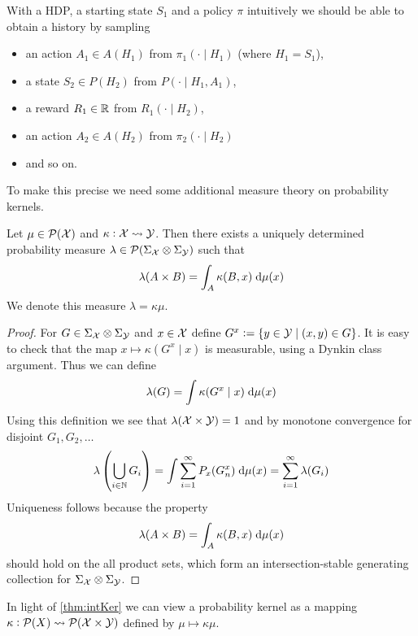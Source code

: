 With a HDP, a starting state $S_1$ and a policy $\pi$ intuitively we
should be able to obtain a history by sampling
\begin{itemize}
  \item an action $A_1 \in A(H_1)$ from $\pi_1(\cdot \mid H_1)$
    (where $H_1 = S_1$),
  \item a state $S_2 \in P(H_2)$ from $P(\cdot \mid H_1, A_1)$,
  \item a reward $R_1 \in \mathbb{R}$ from  $R_1(\cdot \mid H_2)$,
  \item an action $A_2 \in A(H_2)$ from $\pi_2(\cdot \mid H_2)$
  \item and so on.
\end{itemize}

To make this precise we need some additional measure theory on
probability kernels.

\begin{thm}
  Let $\mu \in \mathcal{P}(\mathcal{X})$ and $\kappa : \mathcal{X} \leadsto \mathcal{Y}$.
  Then there exists a uniquely determined probability measure
  $\lambda \in \mathcal{P}(\Sigma_\mathcal{X} \otimes \Sigma_\mathcal{Y})$
  such that
  \[ \lambda(A \times B) = \int_A \kappa(B, x) \; \mathrm{d} \mu(x) \]
  \label{thm:intKer}
  We denote this measure $\lambda = \kappa \mu$.
\end{thm}
\begin{proof}
  For $G \in \Sigma_\mathcal{X} \otimes \Sigma_\mathcal{Y}$ and $x \in \mathcal{X}$ define
  $G^x \vcentcolon= \{ y \in \mathcal{Y} \mid (x, y) \in G \} $.
  It is easy to check that the map $x \mapsto \kappa(G^x \mid x)$ is
  measurable, using a Dynkin class argument.
  Thus we can define
  \[ \lambda(G) = \int \kappa(G^x \mid x) \; \mathrm{d} \mu(x) \]
  Using this definition we see that
  $\lambda(\mathcal{X} \times \mathcal{Y}) = 1$ and by monotone convergence
  for disjoint $G_1, G_2, \dots$
  \[ \lambda \left( \bigcup_{i \in \mathbb{N}} G_i \right)
    = \int \sum_{i=1}^\infty P_x(G^x_n) \; \mathrm{d} \mu(x)
  = \sum_{i=1}^\infty \lambda (G_i) \]
  Uniqueness follows because the property
  \[ \lambda(A \times B) = \int_A \kappa(B, x) \; \mathrm{d} \mu(x) \]
  should hold on the all product sets, which form an
  intersection-stable generating collection for
  $\Sigma_\mathcal{X} \otimes \Sigma_\mathcal{Y}$.
\end{proof}

\begin{rem}
  In light of \cref{thm:intKer} we can view a probability kernel as a mapping
  $\kappa : \mathcal{P}(X) \leadsto \mathcal{P}(\mathcal{X} \times \mathcal{Y})$
  defined by $\mu \mapsto \kappa \mu$.
  \label{rem:measureMap}
\end{rem}

